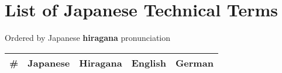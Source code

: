 
\chapter{List of Japanese Technical Terms}
\label{chap:ListOfJapaneseTechnicalTerms}
\label{sec:JapaneseTechnicalTerms}
\normalsize Ordered by Japanese \textbf{hiragana} pronunciation
\footnotesize\Padding
\begin{longtable}[c]{p{.5cm}p{3.5cm}p{4cm}p{3.5cm}p{3.5cm}}
\textbf{\#}&%
\textbf{Japanese}&%
\textbf{Hiragana}&%
\textbf{English}&%
\textbf{German}\\ \hline

\end{longtable}
